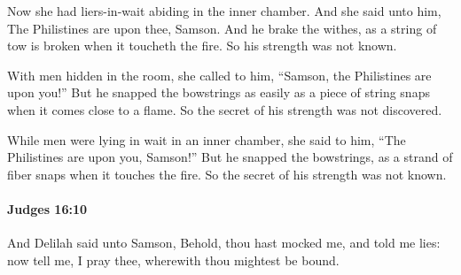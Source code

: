 			\begin{versebox}
					\item[BHS] 
					\item[ASV] Now she had liers-in-wait abiding in the inner chamber. And she said unto him, The Philistines are upon thee, Samson. And he brake the withes, as a string of tow is broken when it toucheth the fire. So his strength was not known.
					\item[NIV] With men hidden in the room, she called to him, “Samson, the Philistines are upon you!” But he snapped the bowstrings as easily as a piece of string snaps when it comes close to a flame. So the secret of his strength was not discovered.
					\item[NRSV] While men were lying in wait in an inner chamber, she said to him, “The Philistines are upon you, Samson!” But he snapped the bowstrings, as a strand of fiber snaps when it touches the fire. So the secret of his strength was not known.
			\end{versebox}

		\paragraph{Judges 16:10} %
			\label{JUDGES-16-10}

			And Delilah said unto Samson, Behold, thou hast mocked me, and told me lies: now tell me, I pray thee, wherewith thou mightest be bound.

